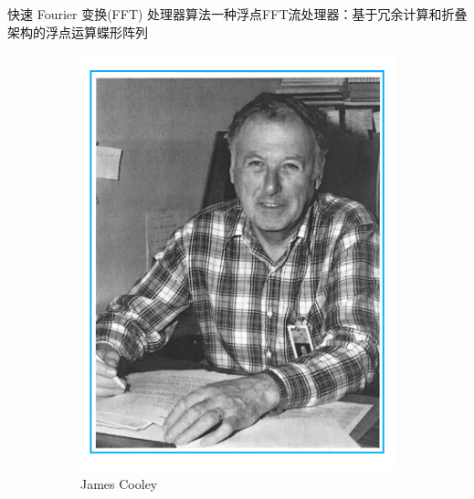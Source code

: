 \documentclass[8pt]{ctexbeamer}
\begin{document}
\begin{frame}{快速 Fourier 变换(FFT) 处理器算法}{一种浮点FFT流处理器：基于冗余计算和折叠架构的浮点运算蝶形阵列}
	\begin{figure}[h!]
		\centering
		\begin{subfigure}[b]{0.4\textwidth}
			\begin{center}
				\includegraphics[scale=0.36]{figure/JamesCooley.png}
			\end{center}
			\caption{James Cooley}
		\end{subfigure}
		\hfill
		\centering
		\begin{subfigure}[b]{0.4\textwidth}
			\begin{center}

\end{center}
\end{subfigure}
\end{figure}
\end{frame}
\end{document}
